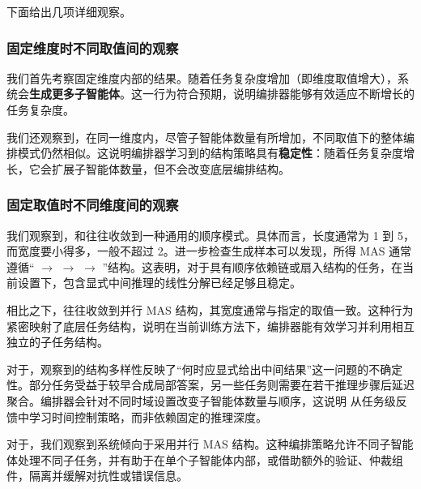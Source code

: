 下面给出几项详细观察。

\subsubsection{固定维度时不同取值间的观察}

我们首先考察固定维度内部的结果。随着任务复杂度增加（即维度取值增大），系统会\textbf{生成更多子智能体}。这一行为符合预期，说明编排器能够有效适应不断增长的任务复杂度。

我们还观察到，在同一维度内，尽管子智能体数量有所增加，不同取值下的整体编排模式仍然相似。这说明编排器学习到的结构策略具有\textbf{稳定性}：随着任务复杂度增长，它会扩展子智能体数量，但不会改变底层编排结构。





\subsubsection{固定取值时不同维度间的观察}

我们观察到，\depth{}和\breadth{}往往收敛到一种通用的顺序模式。具体而言，长度通常为 1 到 5，而宽度要小得多，一般不超过 2。进一步检查生成样本可以发现，所得 MAS 通常遵循“ $\rightarrow$  $\rightarrow$  $\rightarrow$ ”结构。这表明，对于具有顺序依赖链或扇入结构的任务，在当前设置下，包含显式中间推理的线性分解已经足够且稳定。

相比之下，\myparallel{}往往收敛到并行 MAS 结构，其宽度通常与指定的\myparallel{}取值一致。这种行为紧密映射了底层任务结构，说明在当前训练方法下，编排器能有效学习并利用相互独立的子任务结构。

对于\horizon，观察到的结构多样性反映了“何时应显式给出中间结果”这一问题的不确定性。部分任务受益于较早合成局部答案，另一些任务则需要在若干推理步骤后延迟聚合。编排器会针对不同时域设置改变子智能体数量与顺序，这说明 \ourframework 从任务级反馈中学习时间控制策略，而非依赖固定的推理深度。

对于\robustness，我们观察到系统倾向于采用并行 MAS 结构。这种编排策略允许不同子智能体处理不同子任务，并有助于在单个子智能体内部，或借助额外的验证、仲裁组件，隔离并缓解对抗性或错误信息。


